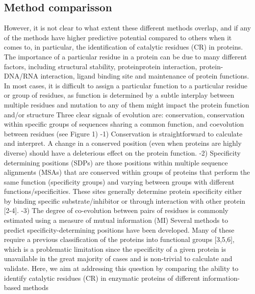 \subsection{Method comparisson}
However, it is not clear to what extent these different methods overlap, and if any of the methods have higher predictive potential compared to others when it comes to, in particular, the identification of catalytic residues (CR) in proteins. \cite{teppa2012disentangling}
The importance of a particular residue in a protein can be due to many different factors, including structural stability, proteinprotein interaction, protein-DNA/RNA interaction, ligand binding site and maintenance of protein functions. \cite{teppa2012disentangling}
In most cases, it is difficult to assign a particular function to a particular residue or group of residues, as function is determined by a subtle interplay between multiple residues and mutation to any of them might impact the protein function and/or structure \cite{teppa2012disentangling}
Three clear signals of evolution are: conservation, conservation within specific groups of sequences sharing a common function, and coevolution between residues (see Figure 1) \cite{teppa2012disentangling}
	-1) Conservation is straightforward to calculate and interpret. A change in a conserved position (even when proteins are highly diverse) should have a deleterious effect on the protein function. \cite{teppa2012disentangling}
	-2) Specificity determining positions (SDPs) are those positions within multiple sequence alignments (MSAs) that are conserved within groups of proteins that perform the same function (specificity groups) and varying between groups with different functions/specificities. These sites generally determine protein specificity either by binding specific substrate/inhibitor or through interaction with other protein [2-4]. \cite{teppa2012disentangling}
	-3) The degree of co-evolution between pairs of residues is commonly estimated using a measure of mutual information (MI) \cite{teppa2012disentangling}
Several methods to predict specificity-determining positions have been developed. Many of these require a previous classification of the proteins into functional groups [3,5,6], which is a problematic limitation since the specificity of a given protein is unavailable in the great majority of cases and is non-trivial to calculate and validate. \cite{teppa2012disentangling}
Here, we aim at addressing this question by comparing the ability to identify catalytic residues (CR) in enzymatic proteins of different information-based methods \cite{teppa2012disentangling}
